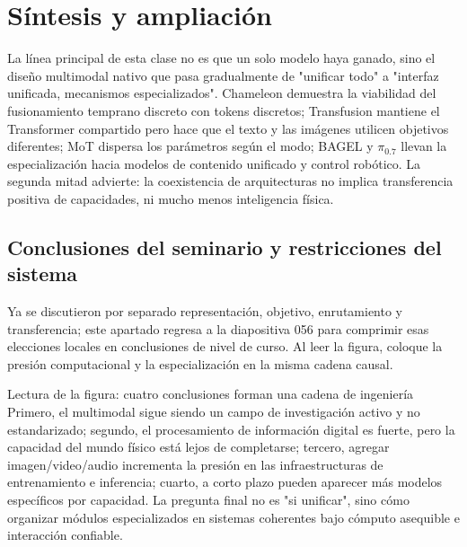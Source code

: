 \section{Síntesis y ampliación}

La línea principal de esta clase no es que un solo modelo haya ganado, sino el diseño multimodal nativo que pasa gradualmente de "unificar todo" a "interfaz unificada, mecanismos especializados". Chameleon demuestra la viabilidad del fusionamiento temprano discreto con tokens discretos; Transfusion mantiene el Transformer compartido pero hace que el texto y las imágenes utilicen objetivos diferentes; MoT dispersa los parámetros según el modo; BAGEL y $\pi_{0.7}$ llevan la especialización hacia modelos de contenido unificado y control robótico. La segunda mitad advierte: la coexistencia de arquitecturas no implica transferencia positiva de capacidades, ni mucho menos inteligencia física.

\subsection{Conclusiones del seminario y restricciones del sistema}

Ya se discutieron por separado representación, objetivo, enrutamiento y transferencia; este apartado regresa a la diapositiva 056 para comprimir esas elecciones locales en conclusiones de nivel de curso. Al leer la figura, coloque la presión computacional y la especialización en la misma cadena causal.


\begin{knowledgebox}{Lectura de la figura: cuatro conclusiones forman una cadena de ingeniería}
Primero, el multimodal sigue siendo un campo de investigación activo y no estandarizado; segundo, el procesamiento de información digital es fuerte, pero la capacidad del mundo físico está lejos de completarse; tercero, agregar imagen/video/audio incrementa la presión en las infraestructuras de entrenamiento e inferencia; cuarto, a corto plazo pueden aparecer más modelos específicos por capacidad. La pregunta final no es "si unificar", sino cómo organizar módulos especializados en sistemas coherentes bajo cómputo asequible e interacción confiable.
\end{knowledgebox}


